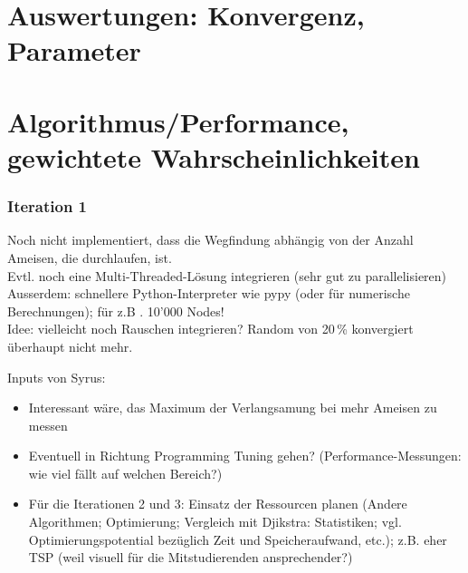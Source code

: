 \vspace*{1cm}


\section{Auswertungen: Konvergenz, Parameter}


\vspace*{1cm}


\section{Algorithmus/Performance, gewichtete Wahrscheinlichkeiten}


\vspace*{1cm}


\subsubsection*{Iteration 1}

Noch nicht implementiert, dass die Wegfindung abhängig von der Anzahl Ameisen, die durchlaufen, ist. \\

Evtl. noch eine Multi-Threaded-Lösung integrieren (sehr gut zu parallelisieren) \\

Ausserdem: schnellere Python-Interpreter wie pypy (oder für numerische Berechnungen); für z.B . 10'000 Nodes! \\

Idee: vielleicht noch Rauschen integrieren? Random von 20\,\% konvergiert überhaupt nicht mehr.

\vspace*{3cm}


Inputs von Syrus: \\

\begin{itemize}
\item Interessant wäre, das Maximum der Verlangsamung bei mehr Ameisen zu messen
\item Eventuell in Richtung Programming Tuning gehen? (Performance-Messungen: wie viel fällt auf welchen Bereich?) 
\item Für die Iterationen 2 und 3: Einsatz der Ressourcen planen (Andere Algorithmen; Optimierung; Vergleich mit Djikstra: Statistiken; vgl. Optimierungspotential bezüglich Zeit und Speicheraufwand, etc.); z.B. eher TSP (weil visuell für die Mitstudierenden ansprechender?) 
\end{itemize}